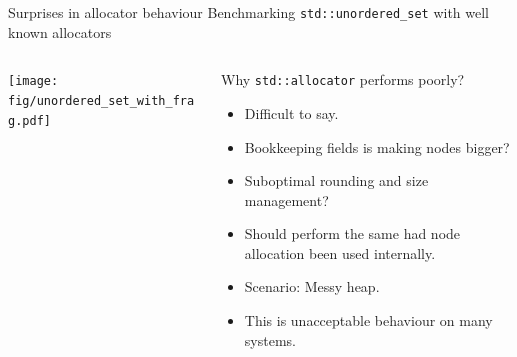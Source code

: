\documentclass[10pt,aspectratio=169]{beamer}
\begin{document}
\begin{frame}
{Surprises in allocator behaviour}
{Benchmarking \texttt{std::unordered\_set} with well known allocators}
\begin{columns}

    \begin{column}{0.47\textwidth}
        \begin{center}
            
            \texttt{[image: fig/unordered\_set\_with\_frag.pdf]} \\
        \end{center}
    \end{column}

    \begin{column}{0.47\textwidth}
         \begin{block}{Why \texttt{std::allocator} performs poorly?}
           \begin{itemize}
           \item Difficult to say.
           \item Bookkeeping fields is making nodes bigger?
           \item Suboptimal rounding and size management? 
           \item Should perform the same had node
           allocation been used internally.
           \item Scenario: Messy heap.
           \item {\color{alertc}This is unacceptable behaviour on many systems.}
           \end{itemize}
         \end{block}
    \end{column}

\end{columns}
\end{frame}


\end{document}

